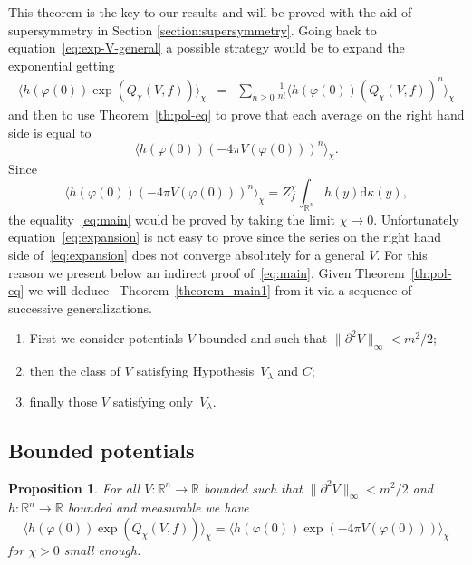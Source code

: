 \documentclass[a4paper,10pt]{article}
\newcommand{\mathd}{\mathrm{d}}
\newtheorem{proposition}[theorem]{Proposition}
{\theorembodyfont{\rmfamily}\newtheorem{remark}[theorem]{Remark}}
\begin{document}
This theorem is the key to our results and will be proved with the aid of
supersymmetry in Section \ref{section:supersymmetry}. Going back to
equation~{\eqref{eq:exp-V-general}} a possible strategy would be to expand the
exponential getting
\begin{equation}
  \begin{array}{lll}
    \langle h (\varphi (0)) \exp (Q_{\chi} (V, f)) \rangle_{\chi} & = &
    \sum_{n \geqslant 0} \frac{1}{n!} \langle h (\varphi (0)) (Q_{\chi} (V,
    f))^n \rangle_{\chi}
  \end{array} \label{eq:expansion}
\end{equation}
and then to use Theorem~\ref{th:pol-eq} to prove that each average on the
right hand side is equal to
\[ \langle h (\varphi (0)) (- 4 \pi V (\varphi (0)))^n \rangle_{\chi} . \]
Since
\[ \langle h (\varphi (0)) (- 4 \pi V (\varphi (0)))^n \rangle_{\chi} =
   Z_f^{\chi} \int_{\mathbb{R}^n} h (y) \mathd \kappa (y), \]
the equality~{\eqref{eq:main}} would be proved by taking the limit $\chi
\rightarrow 0$. Unfortunately equation~{\eqref{eq:expansion}} is not easy to
prove since the series on the right hand side of~{\eqref{eq:expansion}} does
not converge absolutely for a general $V$. For this reason we present below an
indirect proof of~{\eqref{eq:main}}. Given Theorem~\ref{th:pol-eq} we will
deduce \ Theorem~\ref{theorem_main1} from it via a sequence of successive
generalizations.
\begin{enumerate}
  \item First we consider potentials $V$ bounded and such that $\| \partial^2
  V \|_{\infty} < m^2 / 2$;
  
  \item then the class of $V$ satisfying Hypothesis~$V_{\lambda}$ and $C$;
  
  \item finally those $V$ satisfying only~$V_{\lambda}$.
\end{enumerate}

\subsection{Bounded potentials}

\begin{proposition}
  \label{th:equiv-pol}For all $V : \mathbb{R}^n \rightarrow \mathbb{R}$
  bounded such that $\| \partial^2 V \|_{\infty} < m^2 / 2$ and $h :
  \mathbb{R}^n \rightarrow \mathbb{R}$ bounded and measurable we have
  \begin{equation}
    \langle h (\varphi (0)) \exp (Q_{\chi} (V, f)) \rangle_{\chi} = \langle h
    (\varphi (0)) \exp (- 4 \pi V (\varphi (0))) \rangle_{\chi}
    \label{eq:exp-V-bounded}
  \end{equation}
  for $\chi > 0$ small enough. 
\end{proposition}
\end{document}
